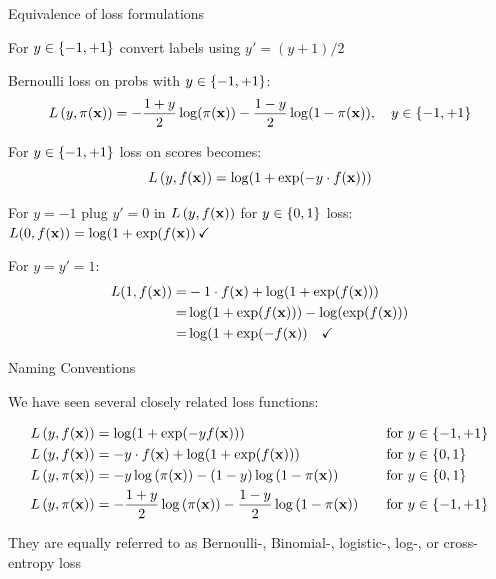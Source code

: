 \documentclass[11pt,compress,t,notes=noshow, xcolor=table]{beamer}
\begin{document}
\begin{framev}[fs=small]{Equivalence of loss formulations}

\begin{itemizeM}
\item For $y \in \{-1, +1\}$ convert labels using $y'=(y+1)/2$ %

\item Bernoulli loss on probs with $y \in \{-1, +1\}$: 
$$
L\left(y, \pi(\mathbf{x})\right)  = - \frac{1 + y}{2} \log(\pi(\mathbf{x})) - \frac{1 - y}{2} \log(1 - \pi(\mathbf{x})), \quad y \in \{-1, +1\} 
$$

\item For $y \in \{-1, +1\}$ loss on scores becomes: 
$$
L\left(y, f(\mathbf{x})\right) = \log(1+\exp(-y \cdot f(\mathbf{x}))) 
$$
\item For $y=-1$ plug $y'=0$ in  $L\left(y, f(\mathbf{x})\right)$ for $y \in \{0, 1\}$ loss: $L(0,f(\mathbf{x}))=\log(1+\exp(f(\mathbf{x})) \, \checkmark$
\item For $y=y'=1$: 
\begin{align*}
L(1,f(\mathbf{x}))=&-1 \cdot f(\mathbf{x})+\log(1+\exp(f(\mathbf{x})))\\
=&\log(1+\exp(f(\mathbf{x})))-\log(\exp(f(\mathbf{x})))\\
=&\log(1+\exp(-f(\mathbf{x})) \quad \checkmark
\end{align*}
\end{itemizeM}

\end{framev}

\begin{vbframe}{Naming Conventions}

We have seen several closely related loss functions: 

\begin{alignat*}{3} L\left(y, f(\mathbf{x})\right)    &= \log(1+\exp(-yf(\mathbf{x}))) &&\quad \text{for } y \in \{-1, +1\} \\ L\left(y, f(\mathbf{x})\right)    &= - y \cdot f(\mathbf{x}) + \log(1 + \exp(f(\mathbf{x}))) &&\quad \text{for } y \in \{0, 1\} \\ L\left(y, \pi(\mathbf{x})\right)  &= - y \log \left(\pi(\mathbf{x})\right) - (1 - y) \log \left(1 - \pi(\mathbf{x})\right) &&\quad \text{for } y \in \{0, 1\} \\ L\left(y, \pi(\mathbf{x})\right)  &= - \frac{1 + y}{2} \log\left(\pi(\mathbf{x})\right) - \frac{1 - y}{2} \log\left(1 - \pi(\mathbf{x})\right) &&\quad \text{for } y \in \{-1, +1\} \end{alignat*}

\vfill

They are equally referred to as Bernoulli-, Binomial-, logistic-, log-, or cross-entropy loss

\end{vbframe}
\end{document}
